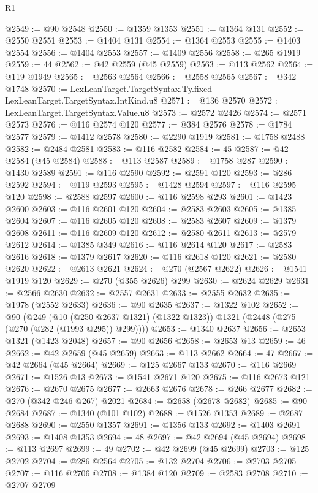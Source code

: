 \begin{lexlean}{R1}
\begin{coremodule}
@2549 := @90 @2548
@2550 := @1359 @1353
@2551 := @1364 @131
@2552 := @2550 @2551
@2553 := @1404 @131
@2554 := @1364 @2553
@2555 := @1403 @2554
@2556 := @1404 @2553
@2557 := @1409 @2556
@2558 := @265 @1919
@2559 := 44
@2562 := @42 @2559 (@45 @2559)
@2563 := @113 @2562
@2564 := @119 @1949
@2565 := @2563 @2564
@2566 := @2558 @2565
@2567 := @342 @1748
@2570 := LexLeanTarget.TargetSyntax.Ty.fixed LexLeanTarget.TargetSyntax.IntKind.u8
@2571 := @136 @2570
@2572 := LexLeanTarget.TargetSyntax.Value.u8
@2573 := @2572 @2426
@2574 := @2571 @2573
@2576 := @116 @2574 @120
@2577 := @384 @2576
@2578 := @1784 @2577
@2579 := @1412 @2578
@2580 := @2290 @1919
@2581 := @1758 @2488
@2582 := @2484 @2581
@2583 := @116 @2582
@2584 := 45
@2587 := @42 @2584 (@45 @2584)
@2588 := @113 @2587
@2589 := @1758 @287
@2590 := @1430 @2589
@2591 := @116 @2590
@2592 := @2591 @120
@2593 := @286 @2592
@2594 := @119 @2593
@2595 := @1428 @2594
@2597 := @116 @2595 @120
@2598 := @2588 @2597
@2600 := @116 @2598 @293
@2601 := @1423 @2600
@2603 := @116 @2601 @120
@2604 := @2583 @2603
@2605 := @1385 @2604
@2607 := @116 @2605 @120
@2608 := @2583 @2607
@2609 := @1379 @2608
@2611 := @116 @2609 @120
@2612 := @2580 @2611
@2613 := @2579 @2612
@2614 := @1385 @349
@2616 := @116 @2614 @120
@2617 := @2583 @2616
@2618 := @1379 @2617
@2620 := @116 @2618 @120
@2621 := @2580 @2620
@2622 := @2613 @2621
@2624 := @270 (@2567 @2622)
@2626 := @1541 @1919 @120
@2629 := @270 (@355 @2626) @299
@2630 := @2624 @2629
@2631 := @2566 @2630
@2632 := @2557 @2631
@2633 := @2555 @2632
@2635 := @1978 (@2552 @2633)
@2636 := @90 @2635
@2637 := @1322 @102
@2652 := @90
    (@249
      (@10 (@250 @2637 @1321) (@1322 @1323))
      @1321
      (@2448 (@275 (@270 (@282 (@1993 @295)) @299))))
@2653 := @1340 @2637
@2656 := @2653 @1321 (@1423 @2048)
@2657 := @90 @2656
@2658 := @2653 @13
@2659 := 46
@2662 := @42 @2659 (@45 @2659)
@2663 := @113 @2662
@2664 := 47
@2667 := @42 @2664 (@45 @2664)
@2669 := @125 @2667 @133
@2670 := @116 @2669
@2671 := @1526 @13
@2673 := @1541 @2671 @120
@2675 := @116 @2673 @121
@2676 := @2670 @2675
@2677 := @2663 @2676
@2678 := @266 @2677
@2682 := @270 (@342 @246 @267) @2021
@2684 := @2658 (@2678 @2682)
@2685 := @90 @2684
@2687 := @1340 (@101 @102)
@2688 := @1526 @1353
@2689 := @2687 @2688
@2690 := @2550 @1357
@2691 := @1356 @133
@2692 := @1403 @2691
@2693 := @1408 @1353
@2694 := 48
@2697 := @42 @2694 (@45 @2694)
@2698 := @113 @2697
@2699 := 49
@2702 := @42 @2699 (@45 @2699)
@2703 := @125 @2702
@2704 := @286 @2564
@2705 := @132 @2704
@2706 := @2703 @2705
@2707 := @116 @2706
@2708 := @1384 @120
@2709 := @2583 @2708
@2710 := @2707 @2709

\end{coremodule}
\end{lexlean}
